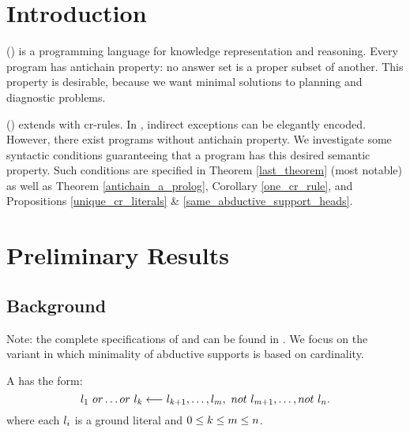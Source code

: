 \documentclass{paper}
\begin{document}
\begin{flushleft}


\section{Introduction}

\aplong{} (\ap) is a programming language
for knowledge representation and reasoning.
Every \ap{} program has antichain property:
no answer set is a proper subset of another.
This property is desirable,
because we want minimal solutions
to planning and diagnostic problems.

\bigskip

\cplong{} (\cp) extends \ap{} with cr-rules.
In \cp, indirect exceptions can be elegantly encoded.
However, there exist \cp{} programs
without antichain property.
We investigate some syntactic conditions
guaranteeing that a \cp{} program
has this desired semantic property.
Such conditions are specified in Theorem \ref{last_theorem}
(most notable) as well as
Theorem \ref{antichain_a_prolog},
Corollary \ref{one_cr_rule},
and Propositions \ref{unique_cr_literals} \&
\ref{same_abductive_support_heads}.


\section{Preliminary Results}

\subsection{Background}

Note: the complete specifications of \ap{} and \cp{}
can be found in \cite[Sections 2.1, 2.2, 5.5]{krb}.
We focus on the \cp{} variant in which
minimality of abductive supports is based on cardinality.

\begin{definition}

A  has the form:
$$l_1\ or \ldots or\ l_k \longleftarrow l_{k+1}, \ldots, l_m,\ not\ {l_{m+1}}, \ldots, not\ {l_n}.$$
where each $l_i$ is a ground literal and
$0 \le k \le m \le n$.

\end{definition}

\begin{definition}
[CR-Rule]


\end{definition}
\end{flushleft}
\end{document}
